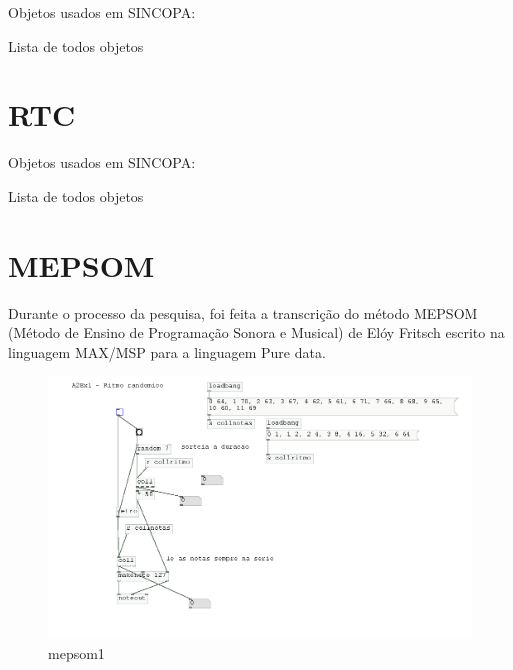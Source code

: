 \documentclass{ppgmus}
\begin{document}
Objetos usados em SINCOPA:



Lista de todos objetos


\section{RTC}
\label{rtc}

Objetos usados em SINCOPA:


Lista de todos objetos


\section{MEPSOM}
\label{mepsom}

Durante o processo da pesquisa, foi feita a transcrição do método MEPSOM (Método de Ensino
de Programação Sonora e Musical) de Elóy Fritsch escrito na linguagem MAX/MSP para a linguagem
Pure data.


\begin{figure}[-h]
\includegraphics[scale=.4]{mepsom1}
\caption{mepsom1}
\label{mepsom1}
\end{figure}
\end{document}
